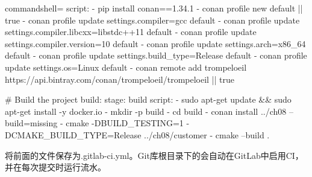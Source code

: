 \begin{tcblisting}{commandshell={}}
  script:
  - pip install conan==1.34.1
  - conan profile new default || true
  - conan profile update settings.compiler=gcc default
  - conan profile update settings.compiler.libcxx=libstdc++11 default
  - conan profile update settings.compiler.version=10 default
  - conan profile update settings.arch=x86_64 default
  - conan profile update settings.build_type=Release default
  - conan profile update settings.os=Linux default
  - conan remote add trompeloeil
https://api.bintray.com/conan/trompeloeil/trompeloeil || true

# Build the project
build:
  stage: build
  script:
  - sudo apt-get update && sudo apt-get install -y docker.io
  - mkdir -p build
  - cd build
  - conan install ../ch08 --build=missing
  - cmake -DBUILD_TESTING=1 -DCMAKE_BUILD_TYPE=Release ../ch08/customer
  - cmake --build .
\end{tcblisting}

将前面的文件保存为.gitlab-ci.yml。Git库根目录下的会自动在GitLab中启用CI，并在每次提交时运行流水。



